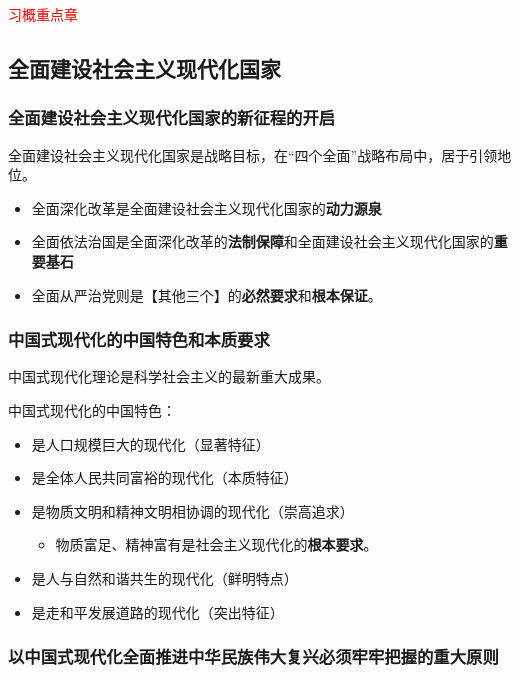\documentclass[12pt, a4paper, oneside]{ctexart}
\begin{document}
\textcolor{red}{习概重点章}

\subsection{全面建设社会主义现代化国家}

\subsubsection{全面建设社会主义现代化国家的新征程的开启}

全面建设社会主义现代化国家是战略目标，在“四个全面”战略布局中，居于引领地位。
\begin{itemize}
  \item 全面深化改革是全面建设社会主义现代化国家的\textbf{动力源泉}
  \item 全面依法治国是全面深化改革的\textbf{法制保障}和全面建设社会主义现代化国家的\textbf{重要基石}
  \item 全面从严治党则是【其他三个】的\textbf{必然要求}和\textbf{根本保证}。
\end{itemize}

\subsubsection{中国式现代化的中国特色和本质要求}

中国式现代化理论是科学社会主义的最新重大成果。

中国式现代化的中国特色：
\begin{itemize}
  \item 是人口规模巨大的现代化（显著特征）
  \item 是全体人民共同富裕的现代化（本质特征）
  \item 是物质文明和精神文明相协调的现代化（崇高追求）
  \begin{itemize}
    \item 物质富足、精神富有是社会主义现代化的\textbf{根本要求}。
  \end{itemize}
  \item 是人与自然和谐共生的现代化（鲜明特点）
  \item 是走和平发展道路的现代化（突出特征）
\end{itemize}

\subsubsection{以中国式现代化全面推进中华民族伟大复兴必须牢牢把握的重大原则}
\end{document}
